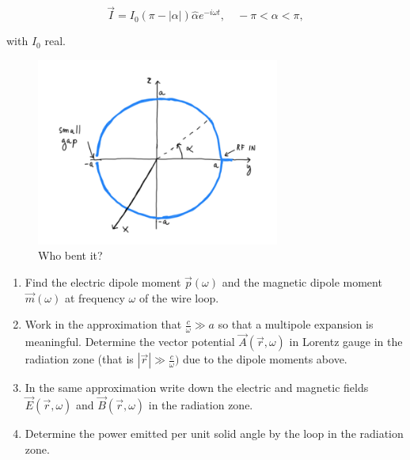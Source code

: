 \begin{equation}
		\vec{I}=I_{0}(\pi-|\alpha|) \hat{\alpha} e^{-i \omega t}, \quad-\pi<\alpha<\pi,
\end{equation}

with $I_{0}$ real.
	
\begin{figure}[h]
	\includegraphics[width=8cm]{figures/examoct20p3.png}
	\centering
	\caption{Who bent it?}
\end{figure}

\begin{enumerate}
	\item Find the electric dipole moment $\vec{p}(\omega)$ and the magnetic dipole moment $\vec{m}(\omega)$ at frequency $\omega$ of the wire loop.
	\item Work in the approximation that $\frac{c}{\omega} \gg a$ so that a multipole expansion is meaningful. Determine the vector potential $\vec{A}(\vec{r}, \omega)$ in Lorentz gauge in the radiation zone (that is $\left|\vec{r}\right| \gg \frac{c}{\omega})$ due to the dipole moments above.
	\item In the same approximation write down the electric and magnetic fields $\vec{E}(\vec{r}, \omega)$ and $\vec{B}(\vec{r}, \omega)$ in the radiation zone.
	\item Determine the power emitted per unit solid angle by the loop in the radiation zone.
\end{enumerate}
	
